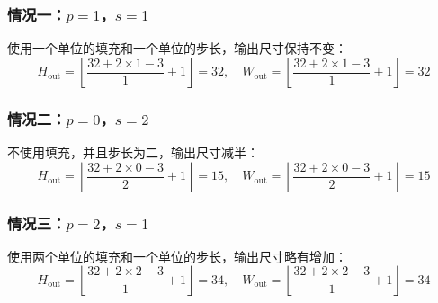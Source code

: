 \documentclass[a4paper,12pt]{article}
\begin{document}
\subsubsection*{情况一：\( p = 1 \)，\( s = 1 \)}
使用一个单位的填充和一个单位的步长，输出尺寸保持不变：
\[
H_{\text{out}} = \left\lfloor \frac{32 + 2 \times 1 - 3}{1} + 1 \right\rfloor = 32, \quad
W_{\text{out}} = \left\lfloor \frac{32 + 2 \times 1 - 3}{1} + 1 \right\rfloor = 32
\]

\subsubsection*{情况二：\( p = 0 \)，\( s = 2 \)}
不使用填充，并且步长为二，输出尺寸减半：
\[
H_{\text{out}} = \left\lfloor \frac{32 + 2 \times 0 - 3}{2} + 1 \right\rfloor = 15, \quad
W_{\text{out}} = \left\lfloor \frac{32 + 2 \times 0 - 3}{2} + 1 \right\rfloor = 15
\]

\subsubsection*{情况三：\( p = 2 \)，\( s = 1 \)}
使用两个单位的填充和一个单位的步长，输出尺寸略有增加：
\[
H_{\text{out}} = \left\lfloor \frac{32 + 2 \times 2 - 3}{1} + 1 \right\rfloor = 34, \quad
W_{\text{out}} = \left\lfloor \frac{32 + 2 \times 2 - 3}{1} + 1 \right\rfloor = 34
\]
\end{document}
